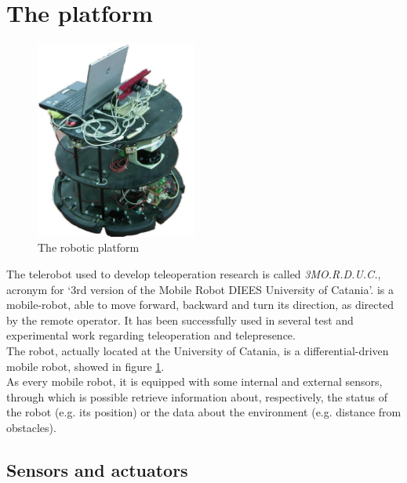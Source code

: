 \section{The \morduc{} platform}
\label{intro:3morduc}

\begin{figure} [h]
  \begin{center}
    \includegraphics[width=150pt]{img/3morduc.jpg}
    \caption{The \morduc{} robotic platform}
    \label{fig:morduc}
  \end{center}
\end{figure}

The telerobot used to develop teleoperation research is
called \textit{3MO.R.D.U.C.}, acronym for `3rd version of
the Mobile Robot DIEES University of Catania'.
\morduc{} is a mobile-robot, able to move forward, backward
and turn its direction, as directed by the remote operator.
It has been successfully used in several test and experimental
work regarding teleoperation and telepresence.
\\
The robot, actually located at the University of
Catania, is a differential-driven mobile robot, showed
in figure \ref{fig:morduc}.
\\
As every mobile robot, it is equipped with some internal
and external sensors, through which is possible retrieve
information about, respectively, the status of the robot
(e.g. its position) or the data about the environment (e.g.
distance from obstacles).

\subsection{Sensors and actuators}
\label{intro:3morduc:sensors_actuators}


